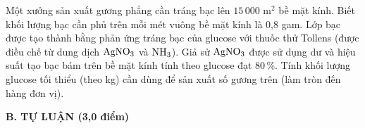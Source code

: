 \documentclass[11pt,a4paper]{article}
\begin{document}
\begin{ex}
Một xưởng sản xuất gương phẳng cần tráng bạc lên $15\,000\text{ m}^2$ bề mặt kính. Biết khối lượng bạc cần phủ trên mỗi mét vuông bề mặt kính là 0,8 gam. Lớp bạc được tạo thành bằng phản ứng tráng bạc của glucose với thuốc thử Tollens (được điều chế từ dung dịch $\ce{AgNO3}$ và $\ce{NH3}$). Giả sử $\ce{AgNO3}$ được sử dụng dư và hiệu suất tạo bạc bám trên bề mặt kính tính theo glucose đạt 80\,\%. Tính khối lượng glucose tối thiểu (theo kg) cần dùng để sản xuất số gương trên (làm tròn đến hàng đơn vị).



\end{ex}

\vspace{6pt}
\noindent
{\color{mainGreen}\textbf{\Large B. TỰ LUẬN (3,0 điểm)}}
\vspace{2pt}
\end{document}
